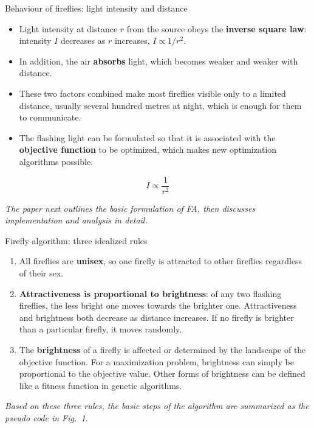 \documentclass[aspectratio=169,11pt]{beamer}
\newcommand{\hdr}[1]{\gdef\curhdr{#1}}
\gdef\curhdr{}
\begin{document}
\begin{frame}[t]{Behaviour of fireflies: light intensity and distance}
\begin{itemize}\itemsep0.5em
  \item Light intensity at distance $r$ from the source obeys the \textbf{inverse square law}: intensity $I$ decreases as $r$ increases, $I\propto 1/r^2$.
  \item In addition, the air \textbf{absorbs} light, which becomes weaker and weaker with distance.
  \item These two factors combined make most fireflies visible only to a limited distance, usually several hundred metres at night, which is enough for them to communicate.
  \item The flashing light can be formulated so that it is associated with the \textbf{objective function} to be optimized, which makes new optimization algorithms possible.
\end{itemize}
\[I\propto\frac{1}{r^{2}}\]
{\footnotesize\itshape The paper next outlines the basic formulation of FA, then discusses implementation and analysis in detail.\par}
\end{frame}

\hdr{3 Firefly Algorithm \textperiodcentered{} 3.2 Firefly Algorithm}
\begin{frame}[t]{Firefly algorithm: three idealized rules}
\begin{enumerate}\itemsep0.8em
  \item All fireflies are \textbf{unisex}, so one firefly is attracted to other fireflies regardless of their sex.
  \item \textbf{Attractiveness is proportional to brightness}: of any two flashing fireflies, the less bright one moves towards the brighter one. Attractiveness and brightness both decrease as distance increases. If no firefly is brighter than a particular firefly, it moves randomly.
  \item The \textbf{brightness} of a firefly is affected or determined by the landscape of the objective function. For a maximization problem, brightness can simply be proportional to the objective value. Other forms of brightness can be defined like a fitness function in genetic algorithms.
\end{enumerate}
{\small\itshape Based on these three rules, the basic steps of the algorithm are summarized as the pseudo code in Fig.~1.\par}
\end{frame}
\end{document}
